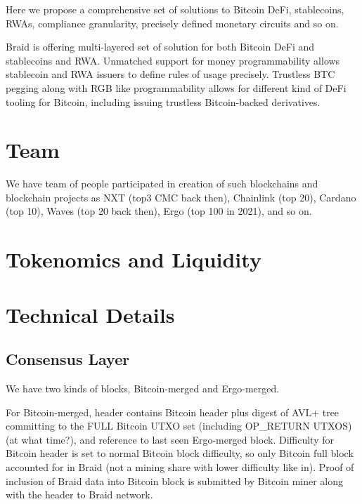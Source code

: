 \documentclass{llncs}   %
\newcommand{\authnote}[2]{\marginpar{\parbox{\marginparwidth}{\tiny %
  \textsf{#1 {\textcolor{blue}{notes: #2}}}}}%
  \textcolor{blue}{\textbf{\dag}}}
\newcommand{\authnote}[2]{
  \textsf{#1 \textcolor{blue}{: #2}}}
\newcommand{\authnote}[2]{}
\newcommand{\knote}[1]{{\authnote{\textcolor{green}{kushti notes}}{#1}}}
\newcommand{\bc}{Braid}
\begin{document}
Here we propose a comprehensive set of solutions to Bitcoin DeFi, stablecoins, RWAs,
compliance granularity, precisely defined monetary circuits and so on.  

\bc{} is offering multi-layered set of solution for both Bitcoin DeFi and stablecoins and RWA. Unmatched support for money programmability allows stablecoin and RWA issuers to define rules of usage precisely. Trustless BTC pegging along with RGB like programmability allows for different kind of DeFi tooling for Bitcoin, including issuing trustless Bitcoin-backed derivatives. 


\section{Team}
\label{sec-team}

We have team of people participated in creation of such blockchains and blockchain projects as NXT (top3 CMC back then), Chainlink (top 20),
 Cardano (top 10), Waves (top 20 back then), Ergo (top 100 in 2021), and so on.


\section{Tokenomics and Liquidity}
\label{sec-tokenomics}

\knote{to be decided later}



\section{Technical Details}
\label{sec-techdetails}

\subsection{Consensus Layer}

We have two kinds of blocks, Bitcoin-merged and Ergo-merged.

For Bitcoin-merged, header contains Bitcoin header plus digest of AVL+ tree committing to the FULL Bitcoin UTXO set (including OP\_RETURN UTXOS) (at what time?), and reference to last seen Ergo-merged block. Difficulty for Bitcoin header is set to normal Bitcoin block difficulty, so only Bitcoin full block accounted for in Braid (not a mining share with lower difficulty like in). Proof of inclusion of Braid data into Bitcoin block is submitted by Bitcoin miner along with the header to Braid network.
\end{document}
